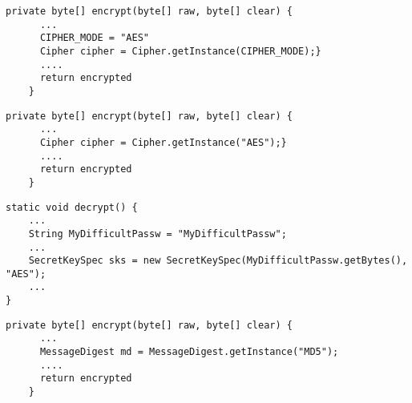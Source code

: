 \label{sec:appendix}
\begin{lstlisting}[caption={A real code snippet taken from Stackoverflow. I want to build a tool which after analyzing the code snippet will highlight the part of the code that is insecure and suggest an alternative secure implementation as showed in the figure.}, label={fig:motivating-example}]
    private byte[] encrypt(byte[] raw, byte[] clear) {
      ...
      CIPHER_MODE = "AES"
      Cipher cipher = Cipher.getInstance(CIPHER_MODE);}
      ....
      return encrypted
    }
     \end{lstlisting}

\begin{lstlisting}[caption={A real code snippet taken from Stackoverflow. I want to build a tool which after analyzing the code snippet will highlight the part of the code that is insecure and suggest an alternative secure implementation as showed in the figure.}, label={fig:motivating-example}]
    private byte[] encrypt(byte[] raw, byte[] clear) {
      ...
      Cipher cipher = Cipher.getInstance("AES");}
      ....
      return encrypted
    }
     \end{lstlisting}

\begin{lstlisting}[caption={A real code snippet taken from Stackoverflow. I want to build a tool which after analyzing the code snippet will highlight the part of the code that is insecure and suggest an alternative secure implementation as showed in the figure.}, label={fig:motivating-example}]
static void decrypt() {
    ...
    String MyDifficultPassw = "MyDifficultPassw";
    ...  
    SecretKeySpec sks = new SecretKeySpec(MyDifficultPassw.getBytes(), "AES");
    ...
}
\end{lstlisting}
\begin{lstlisting}[caption={A real code snippet taken from Stackoverflow. I want to build a tool which after analyzing the code snippet will highlight the part of the code that is insecure and suggest an alternative secure implementation as showed in the figure.}, label={fig:motivating-example}]
    private byte[] encrypt(byte[] raw, byte[] clear) {
      ...
      MessageDigest md = MessageDigest.getInstance("MD5");
      ....
      return encrypted
    }
\end{lstlisting}
